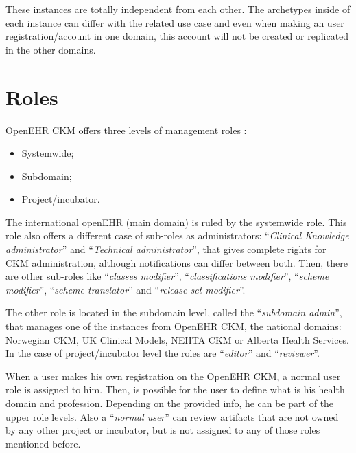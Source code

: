 \documentclass[mim_thesis.tex]{subfiles}
\begin{document}
These instances are totally independent from each other. The archetypes inside of each instance can differ with the related use case and even when making an user registration/account in one domain, this account will not be created or replicated in the other domains.

\section{Roles}
OpenEHR CKM offers three levels of management roles \citep{openEHRCKM}:
\begin{itemize}[noitemsep]
\item Systemwide; 
\item Subdomain; 
\item Project/incubator.
\end{itemize}

The international openEHR (main domain) is ruled by the systemwide role. This role also offers a different case of sub-roles as administrators: “\textit{Clinical Knowledge administrator}” and “\textit{Technical administrator}”, that gives complete rights for CKM administration, although notifications can differ between both. Then, there are other sub-roles like “\textit{classes modifier}”, “\textit{classifications modifier}”, “\textit{scheme modifier}”, “\textit{scheme translator}” and “\textit{release set modifier}”. 

The other role is located in the subdomain level, called the “\textit{subdomain admin}”, that manages one of the instances from OpenEHR CKM, the national domains: Norwegian CKM, UK Clinical Models, NEHTA CKM or Alberta Health Services. In the case of project/incubator level the roles are “\textit{editor}” and “\textit{reviewer}”.

When a user makes his own registration on the OpenEHR CKM, a normal user role is assigned to him. Then, is possible for the user to define what is his health domain and profession. Depending on the provided info, he can be part of the upper role levels. Also a “\textit{normal user}” can review artifacts that are not owned by any other project or incubator, but is not assigned to any of those roles mentioned before. 
\end{document}
